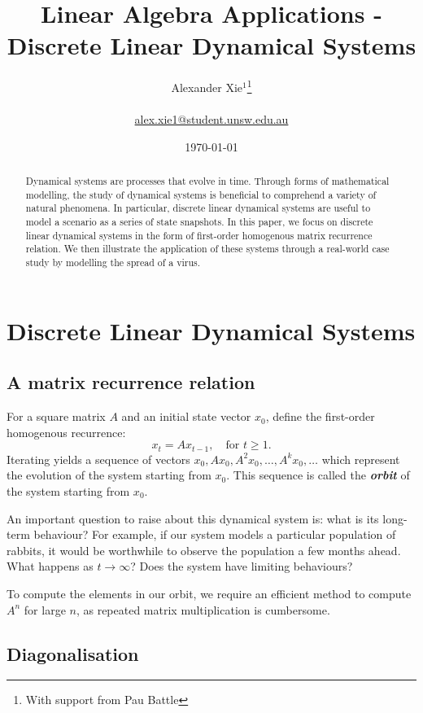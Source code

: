 \documentclass[a4paper]{article}
\title{Linear Algebra Applications - Discrete Linear Dynamical Systems}
\author{Alexander Xie$^1$\thanks{With support from Pau Battle}\\\\
	\href{mailto:alex.xie1@student.unsw.edu.au}{alex.xie1@student.unsw.edu.au}}
\date{\printdayoff\today}
\theoremstyle{plain}
\theoremstyle{definition}
\begin{document}
\maketitle

\begin{abstract}
	Dynamical systems are processes that evolve in time. Through forms of mathematical modelling, the study of dynamical
	systems is beneficial to comprehend a variety of natural phenomena. In particular, discrete linear dynamical systems
	are useful to model a scenario as a series of state snapshots.
	In this paper, we focus on discrete linear dynamical systems in the form of first-order homogenous matrix recurrence
	relation. We then illustrate the application of these systems through a real-world case study by modelling the
	spread of a virus.

\end{abstract}

\tableofcontents

\pagebreak

\section{Discrete Linear Dynamical Systems}

\subsection{A matrix recurrence relation}

For a square matrix $A$ and an initial state vector $x_0$, define the first-order homogenous recurrence:
\[ x_t=Ax_{t-1},\quad \text{for } t\geq 1. \]
Iterating yields a sequence of vectors $x_0, Ax_0, A^2x_0,\ldots, A^kx_0,\ldots$ which represent the evolution of the
system starting from $x_0$. This sequence is called the \textbf{\textit{orbit}} of the
system starting from $x_0$.

An important question to raise about this dynamical system is: what is its long-term behaviour? For example, if our
system models a particular population of rabbits, it would be worthwhile to observe the population a few months ahead.
What happens as $t\to\infty$? Does the system have limiting behaviours?

To compute the elements in our orbit, we require an efficient method to compute $A^n$ for large $n$, as repeated
matrix multiplication is cumbersome.

\subsection{Diagonalisation}
\end{document}
